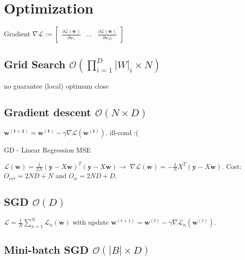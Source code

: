 \section{Optimization}
Gradient $\nabla \mathcal{L} := \begin{bmatrix} \frac{\partial \mathcal{L}(\mathbf{w})}{\partial w_1} & \dots & \frac{\partial \mathcal{L}(\mathbf{w})}{\partial w_D} \end{bmatrix}$
\subsection{Grid Search $\mathcal{O}(\prod_{i=1}^D|W|_i\times N)$}
no guarantee (local) optimum close
\subsection{Gradient descent $\mathcal{O}(N\times D)$}

$\mathbf{w^{(t+1)}} = \mathbf{w^{(t)}} - \gamma \nabla \mathcal{L}(\mathbf{w^{(t)}})$. ill-cond :(

GD - Linear Regression MSE

$\mathcal{L}(\mathbf{w}) = \frac{1}{2N} (\mathbf{y} - X\mathbf{w})^T(\mathbf{y} - X\mathbf{w}) \rightarrow$ \newline $ \nabla \mathcal{L}(\mathbf{w}) = - \frac{1}{N} X^T(\mathbf{y} - X\mathbf{w})$. Cost: \newline $O_{err} = 2ND + N$ and $O_{w} = 2ND + D$.

\subsection{SGD $\mathcal{O}(D)$}

$\mathcal{L} = \frac{1}{N} \sum_{n=1}^N{\mathcal{L}}_n(\mathbf{w})$ with update \newline $\mathbf{w}^{(t+1)} = \mathbf{w}^{(t)} - \gamma \nabla \mathcal{L}_n(\mathbf{w}^{(t)})$.

\subsection{Mini-batch SGD $\mathcal{O}(|B|\times D)$}

